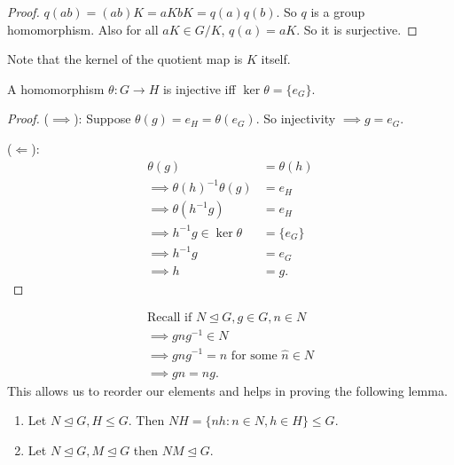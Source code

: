\begin{proof}
  $q(ab) = (ab)K = aKbK = q(a)q(b)$. So $q$ is a group homomorphism. Also for all $aK \in G/K$, $q(a) = aK$. So it is surjective.
\end{proof}

Note that the kernel of the quotient map is $K$ itself.

\begin{lemma}
\protect\hypertarget{lem:thirteen}{}\label{lem:thirteen}A homomorphism $\theta : G \to H$ is injective iff $\ker \theta = \{ e_G \}$.
\end{lemma}

\begin{proof}
($\implies$): Suppose $\theta(g) = e_H = \theta (e_G)$.
So injectivity $\implies g = e_G$.

($\Longleftarrow$): \begin{align*}
    \theta(g) &= \theta(h) \\
    \implies \theta(h)^{-1} \theta(g) &= e_H \\
    \implies \theta(h^{-1} g) &= e_H \\
    \implies h^{-1} g \in \ker \theta &= \{ e_G \} \\
    \implies h^{-1} g &= e_G \\
    \implies h &= g.
\end{align*}
\end{proof}

\begin{align*}
    \text{Recall if } N \trianglelefteq G, g \in G, n \in N \\
    \implies gng^{-1} \in N \\
    \implies gng^{-1} = \hat{n} \text{ for some } \hat{n} \in N \\
    \implies gn = \hat{n} g.
\end{align*}
This allows us to reorder our elements and helps in proving the following lemma.

\begin{lemma}
\protect\hypertarget{lem:fourteen}{}\label{lem:fourteen}
\mbox{}
  \begin{enumerate}
  \def\labelenumi{\roman{enumi}.}
  \item
    Let $N \trianglelefteq G, H \leq G$.
    Then $NH = \{ nh : n \in N, h \in H \} \leq G$.
  \item
    Let $N \trianglelefteq G, M \trianglelefteq G$ then $NM \trianglelefteq G$.
  \end{enumerate}
\end{lemma}


